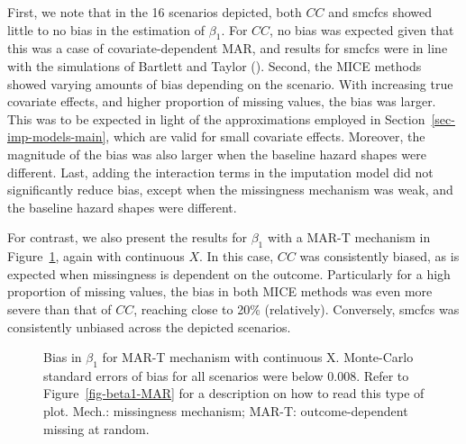 \documentclass[
  letterpaper,
  paper=240mm:170mm,
  twoside=true,
  open=right,
  fontsize=10pt,
  pagesize=false,
  BCOR=15mm,
  DIV=14,
  headinclude=true,
  footinclude=false,
  headsepline=on]{scrbook}
\begin{document}
First, we note that in the 16 scenarios depicted, both \(CC\) and smcfcs
showed little to no bias in the estimation of \(\beta_1\). For \(CC\),
no bias was expected given that this was a case of covariate-dependent
MAR, and results for smcfcs were in line with the simulations of
Bartlett and Taylor
(). Second,
the MICE methods showed varying amounts of bias depending on the
scenario. With increasing true covariate effects, and higher proportion
of missing values, the bias was larger. This was to be expected in light
of the approximations employed in Section~\ref{sec-imp-models-main},
which are valid for small covariate effects. Moreover, the magnitude of
the bias was also larger when the baseline hazard shapes were different.
Last, adding the interaction terms in the imputation model did not
significantly reduce bias, except when the missingness mechanism was
weak, and the baseline hazard shapes were different.

For contrast, we also present the results for \(\beta_1\) with a MAR-T
mechanism in Figure~\ref{fig-beta1-MAR-T}, again with continuous \(X\).
In this case, \(CC\) was consistently biased, as is expected when
missingness is dependent on the outcome. Particularly for a high
proportion of missing values, the bias in both MICE methods was even
more severe than that of \(CC\), reaching close to 20\% (relatively).
Conversely, smcfcs was consistently unbiased across the depicted
scenarios.

\begin{figure}


\caption{\label{fig-beta1-MAR-T}Bias in \(\beta_1\) for MAR-T mechanism
with continuous X. Monte-Carlo standard errors of bias for all scenarios
were below 0.008. Refer to Figure~\ref{fig-beta1-MAR} for a description
on how to read this type of plot. Mech.: missingness mechanism; MAR-T:
outcome-dependent missing at random.}

\end{figure}%
\end{document}

